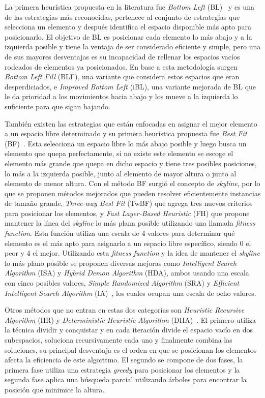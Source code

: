 \documentclass[letter, 10pt]{article}
\begin{document}
La primera heur\'istica propuesta en la literatura fue \emph{Bottom Left} (BL)~\cite{oliveira2016survey} y es una de las estrategias m\'as reconocidas, pertenece al conjunto de estrategias que selecciona un elemento y despu\'es identifica el espacio disponible m\'as apto para posicionarlo. El objetivo de BL es posicionar cada elemento lo m\'as abajo y a la izquierda posible y tiene la ventaja de ser considerado eficiente y simple, pero una de sus mayores desventajas es su incapacidad de rellenar los espacios vac\'ios rodeados de elementos ya posicionados. En base a esta metodolog\'ia surgen \emph{Bottom Left Fill} (BLF), una variante que considera estos espacios que eran desperdiciados, e \emph{Improved Bottom Left} (iBL), una variante mejorada de BL que le da prioridad a los movimientos hacia abajo y los mueve a la izquierda lo suficiente para que sigan bajando. 

Tambi\'en existen las estrategias que est\'an enfocadas en asignar el mejor elemento a un espacio libre determinado y su primera heur\'istica propuesta fue \emph{Best Fit} (BF)~\cite{verstichel2013improved}. Esta selecciona un espacio libre lo m\'as abajo posible y luego busca un elemento que quepa perfectamente, si no existe este elemento se escoge el elemento m\'as grande que quepa en dicho espacio y tiene tres posibles posiciones, lo m\'as a la izquierda posible, junto al elemento de mayor altura o junto al elemento de menor altura. Con el m\'etodo BF surgi\'o el concepto de \emph{skyline}, por lo que se proponen m\'etodos mejorados que pueden resolver eficientemente instancias de tama\~no grande, \emph{Three-way Best Fit} (TwBF) que agrega tres nuevos criterios para posicionar los elementos, y \emph{Fast Layer-Based Heuristic} (FH) que propone mantener la l\'inea del \emph{skyline} lo m\'as plana posible utilizando una llamada \emph{fitness function}. Esta funci\'on utiliza una escala de 4 valores para determinar qu\'e elemento es el m\'as apto para asignarlo a un espacio libre espec\'ifico, siendo 0 el peor y 4 el mejor. Utilizando esta \emph{fitness function} y la idea de mantener el \emph{skyline} lo m\'as plano posible se proponen diversas mejoras como \emph{Intelligent Search Algorithm} (ISA) y \emph{Hybrid Demon Algorithm} (HDA), ambos usando una escala con cinco posibles valores, \emph{Simple Randomized Algorithm} (SRA) y \emph{Efficient Intelligent Search Algorithm} (IA)~\cite{wei2016efficient}, los cuales ocupan una escala de ocho valores.

Otros m\'etodos que no entran en estas dos categor\'ias son \emph{Heuristic Recursive Algorithm} (HR) y \emph{Deterministic Heuristic Algorithm} (DHA)~\cite{he2013heuristics}. El primero utiliza la t\'ecnica dividir y conquistar y en cada iteraci\'on divide el espacio vac\'io en dos subespacios, soluciona recursivamente cada uno y finalmente combina las soluciones, su principal desventaja es el orden en que se posicionan los elementos afecta la eficiencia de este algoritmo. El segundo se compone de dos fases, la primera fase utiliza una estrategia \emph{greedy} para posicionar los elementos y la segunda fase aplica una b\'usqueda parcial utilizando \'arboles para encontrar la posici\'on que minimice la altura. 
\end{document}
